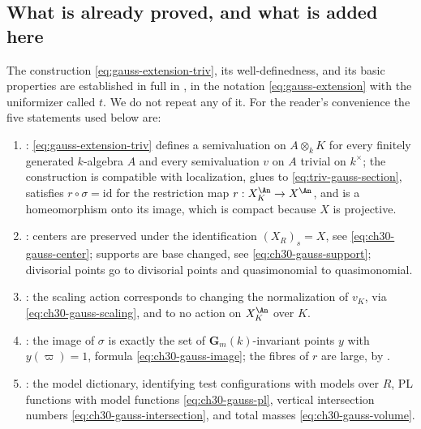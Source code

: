 \subsection{What is already proved, and what is added here}
\label{sec:ch32-gauss-imported}

The construction \eqref{eq:gauss-extension-triv}, its well-definedness, and
its basic properties are established in full in , in the
notation \eqref{eq:gauss-extension} with the uniformizer called $t$.  We
do not repeat any of it.  For the reader's convenience the five statements
used below are:

\begin{enumerate}
\item\label{itm:ch32-gi:welldef}
: \eqref{eq:gauss-extension-triv} defines a
semivaluation on $A\otimes_kK$ for every finitely generated $k$-algebra
$A$ and every semivaluation $v$ on $A$ trivial on $k^\times$; the
construction is compatible with localization, glues to
\eqref{eq:triv-gauss-section}, satisfies $r\circ\sigma=\mathrm{id}$ for the
restriction map $r:X_K^{\An}\to X^{\An}$, and is a homeomorphism onto its image, which is compact because $X$ is
projective.
\item\label{itm:ch32-gi:centers}
: centers are preserved under the
identification $(X_R)_s=X$, see \eqref{eq:ch30-gauss-center}; supports are
base changed, see \eqref{eq:ch30-gauss-support}; divisorial points go to
divisorial points and quasimonomial to quasimonomial.
\item\label{itm:ch32-gi:scaling}
: the scaling action corresponds to changing
the normalization of $v_K$, via \eqref{eq:ch30-gauss-scaling}, and to no
action on $X_K^{\An}$ over $K$.
\item\label{itm:ch32-gi:image}
: the image of $\sigma$ is exactly the set of
$\mathbf G_m(k)$-invariant points $y$ with $y(\varpi)=1$, formula
\eqref{eq:ch30-gauss-image}; the fibres of $r$ are large, by
.
\item\label{itm:ch32-gi:dictionary}
: the model dictionary, identifying
test configurations with models over $R$, PL functions with model
functions \eqref{eq:ch30-gauss-pl}, vertical intersection numbers
\eqref{eq:ch30-gauss-intersection}, and total masses
\eqref{eq:ch30-gauss-volume}.
\end{enumerate}

